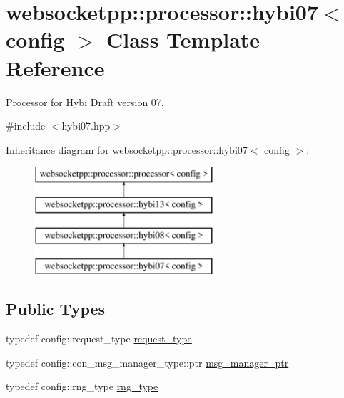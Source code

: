 \hypertarget{classwebsocketpp_1_1processor_1_1hybi07}{}\section{websocketpp\+:\+:processor\+:\+:hybi07$<$ config $>$ Class Template Reference}
\label{classwebsocketpp_1_1processor_1_1hybi07}


Processor for Hybi Draft version 07.  




{\ttfamily \#include $<$hybi07.\+hpp$>$}

Inheritance diagram for websocketpp\+:\+:processor\+:\+:hybi07$<$ config $>$\+:\begin{figure}[H]
\begin{center}
\leavevmode
\includegraphics[height=4.000000cm]{classwebsocketpp_1_1processor_1_1hybi07}
\end{center}
\end{figure}
\subsection*{Public Types}
\begin{DoxyCompactItemize}
\item 
typedef config\+::request\+\_\+type \hyperlink{classwebsocketpp_1_1processor_1_1hybi07_ae8e3aeed4b4d6d67c8af5dccf70d468d}{request\+\_\+type}
\item 
typedef config\+::con\+\_\+msg\+\_\+manager\+\_\+type\+::ptr \hyperlink{classwebsocketpp_1_1processor_1_1hybi07_abfa0723364d644f3320141ade624fc8e}{msg\+\_\+manager\+\_\+ptr}
\item 
typedef config\+::rng\+\_\+type \hyperlink{classwebsocketpp_1_1processor_1_1hybi07_afb0db8323385a430df83372ce5b29bc2}{rng\+\_\+type}
\end{DoxyCompactItemize}
